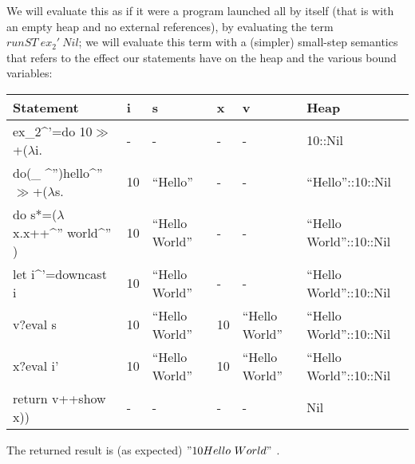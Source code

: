 \documentclass[a4paper]{article}
\begin{document}
We will evaluate this as if it were a program launched all by itself (that is with an empty heap and no external references), by evaluating the term $runST\ ex_2'\ Nil$; we will evaluate this term with a (simpler) small-step semantics that refers to the effect our statements have on the heap and the various bound variables:

\begin{tabular}{|p{1.1in}|p{0.2in}|p{0.7in}|p{0.2in}|p{0.7in}|p{1.0in}|} \hline 
Statement & i & s & x & v & Heap \\ \hline 
ex\_2\^{}'=do 10$\gg $+($\lambda $i. & - & - & - & - & 10::Nil \\ \hline 
do(\_ \^{}'')hello\^{}''$\gg $+($\lambda $s. & 10 & ``Hello'' & - & - & ``Hello''::10::Nil \\ \hline 
do s*=($\lambda $x.x++\^{}'' world\^{}'' ) & 10 & ``Hello World'' & - & - & ``Hello World''::10::Nil \\ \hline 
let i\^{}'=downcast i & 10 & ``Hello World'' & - & - & ``Hello World''::10::Nil \\ \hline 
 v?eval s & 10 & ``Hello World'' & 10 & ``Hello World'' & ``Hello World''::10::Nil \\ \hline 
 x?eval i' & 10 & ``Hello World'' & 10 & ``Hello World'' & ``Hello World''::10::Nil \\ \hline 
 return v++show x)) & - & - & - & - & Nil \\ \hline 
\end{tabular}



\noindent The returned result is (as expected) $"10Hello\ World"\ $.

\noindent 

\noindent 

\noindent 

\noindent 
\end{document}
